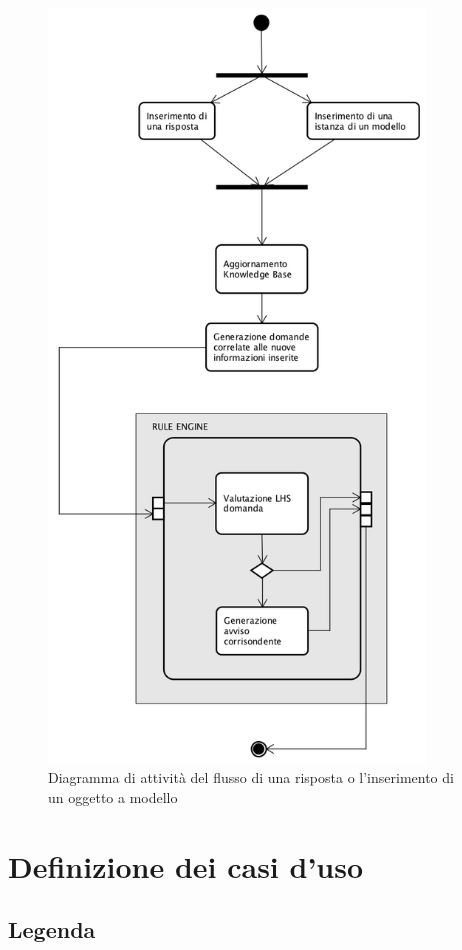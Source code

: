 \begin{figure}[H]
	\begin{center}
		\includegraphics[width=10cm]{Pics/diagramma_attivita_risposte.png}
		\caption{Diagramma di attività del flusso di una risposta o l'inserimento di un oggetto a modello}
		\label{fig:DiagrammaAttivitaRisposte}
	\end{center}
\end{figure}





\section{Definizione dei casi d'uso}
	\subsection{Legenda}
